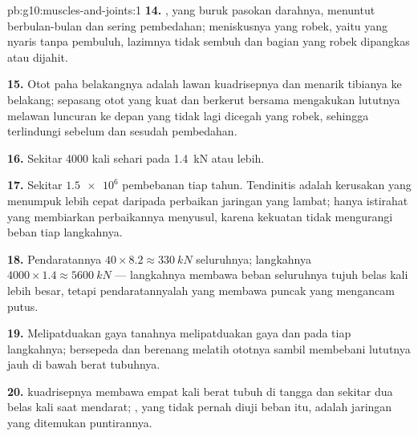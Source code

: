 \begin{solution}{pb:g10:muscles-and-joints:1}
\textbf{14.} , yang buruk pasokan darahnya, menuntut
berbulan-bulan dan sering pembedahan; meniskusnya yang robek, yaitu
 yang nyaris tanpa pembuluh, lazimnya tidak sembuh dan
bagian yang robek dipangkas atau dijahit.

\textbf{15.} Otot paha belakangnya adalah lawan kuadrisepnya dan
menarik tibianya ke belakang; sepasang otot yang kuat dan berkerut
bersama mengakukan lututnya melawan luncuran ke depan yang tidak lagi
dicegah  yang robek, sehingga  terlindungi sebelum
dan sesudah pembedahan.

\textbf{16.} Sekitar 4000 kali sehari pada \qty{1.4}{kN} atau lebih.

\textbf{17.} Sekitar $\num{1.5e6}$ pembebanan tiap tahun. Tendinitis
adalah kerusakan yang menumpuk lebih cepat daripada perbaikan jaringan
 yang lambat; hanya istirahat yang membiarkan perbaikannya
menyusul, karena kekuatan tidak mengurangi beban tiap langkahnya.

\textbf{18.} Pendaratannya $40 \times 8.2 \approx \qty{330}{kN}$
seluruhnya; langkahnya $4000 \times 1.4 \approx \qty{5600}{kN}$ ---
langkahnya membawa beban seluruhnya tujuh belas kali lebih besar,
tetapi pendaratannyalah yang membawa puncak yang mengancam putus.

\textbf{19.} Melipatduakan gaya tanahnya melipatduakan gaya  dan
 pada tiap langkahnya; bersepeda dan berenang melatih ototnya
sambil membebani lututnya jauh di bawah berat tubuhnya.

\textbf{20.}  kuadrisepnya membawa empat kali berat tubuh di
tangga dan sekitar dua belas kali saat mendarat; , yang tidak
pernah diuji beban itu, adalah jaringan yang ditemukan puntirannya.
\end{solution}
